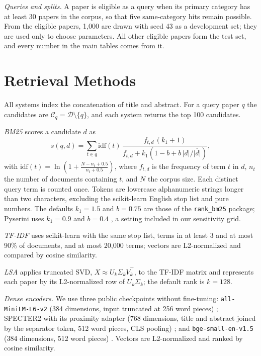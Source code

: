 \documentclass[conference]{IEEEtran}
\begin{document}


\textit{Queries and splits.} A paper is eligible as a query when its primary category has at least 30 papers in the corpus, so that five same-category hits remain possible. From the eligible papers, 1{,}000 are drawn with seed 43 as a development set; they are used only to choose parameters. All other eligible papers form the test set, and every number in the main tables comes from it.

\section{Retrieval Methods}
\label{sec:methods}

All systems index the concatenation of title and abstract. For a query paper $q$ the candidates are $\mathcal{C}_q = \mathcal{D}\setminus\{q\}$, and each system returns the top 100 candidates.

\textit{BM25} \cite{robertson2009bm25} scores a candidate $d$ as
\begin{equation}
s(q,d)=\sum_{t\in q}\mathrm{idf}(t)\,\frac{f_{t,d}\,(k_1+1)}{f_{t,d}+k_1\!\left(1-b+b\,|d|/\overline{|d|}\right)},
\label{eq:bm25}
\end{equation}
with $\mathrm{idf}(t)=\ln\!\left(1+\frac{N-n_t+0.5}{n_t+0.5}\right)$, where $f_{t,d}$ is the frequency of term $t$ in $d$, $n_t$ the number of documents containing $t$, and $N$ the corpus size. Each distinct query term is counted once. Tokens are lowercase alphanumeric strings longer than two characters, excluding the scikit-learn English stop list and pure numbers. The defaults $k_1=1.5$ and $b=0.75$ are those of the \texttt{rank\_bm25} package; Pyserini uses $k_1=0.9$ and $b=0.4$ \cite{lin2021pyserini}, a setting included in our sensitivity grid.

\textit{TF-IDF} \cite{salton1988term} uses scikit-learn with the same stop list, terms in at least 3 and at most 90\% of documents, and at most 20{,}000 terms; vectors are L2-normalized and compared by cosine similarity.

\textit{LSA} \cite{deerwester1990lsa} applies truncated SVD, $X\approx U_k\Sigma_kV_k^{\top}$, to the TF-IDF matrix and represents each paper by its L2-normalized row of $U_k\Sigma_k$; the default rank is $k=128$.

\textit{Dense encoders.} We use three public checkpoints without fine-tuning: \texttt{all-MiniLM-L6-v2} (384 dimensions, input truncated at 256 word pieces) \cite{wang2020minilm,reimers2019sbert}; SPECTER2 with its proximity adapter (768 dimensions, title and abstract joined by the separator token, 512 word pieces, CLS pooling) \cite{singh2023scirepeval}; and \texttt{bge-small-en-v1.5} (384 dimensions, 512 word pieces) \cite{xiao2024cpack}. Vectors are L2-normalized and ranked by cosine similarity.
\end{document}
